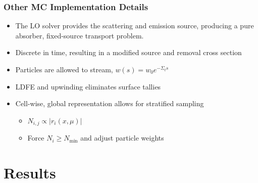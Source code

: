 \documentclass[xcolor=dvipsnames,handout,hyperref={pdfpagelabels=false}]{beamer}
\newcommand{\colb}[1]{{\color{blue} #1}}
\newlength{\wideitemsep}
\let\olditem\item
\renewcommand{\item}{\setlength{\itemsep}{\wideitemsep}\olditem}
\begin{document}
\begin{frame}
    \frametitle{Other MC Implementation Details}
    \begin{itemize}
        \item The LO solver provides the scattering and emission source, producing a
            pure absorber, fixed-source transport problem.
        \item Discrete in time, resulting in a modified source and removal cross
            section
        \item Particles are allowed to stream, $w(s)=w_0 e^{-\Sigma_t s}$
        \item LDFE and upwinding \colb{eliminates} surface tallies
    \item Cell-wise, global representation allows for \colb{stratified} sampling
        \begin{itemize}
            \item $N_{i,j} \propto{|r_i(x,\mu)|}$
            \item Force $N_i \geq N_{\min}$ and adjust particle weights
        \end{itemize}
    \end{itemize}
\end{frame}


\section{Results}
\subsection{}
\end{document}
